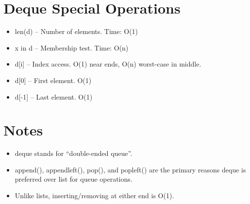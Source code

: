 \documentclass[11pt]{article}
\begin{document}
\section*{Deque Special Operations}

\begin{itemize}
\item len(d) -- Number of elements. Time: O(1)
\item x in d -- Membership test. Time: O(n)
\item d[i] -- Index access. O(1) near ends, O(n) worst-case in middle.
\item d[0] -- First element. O(1)
\item d[-1] -- Last element. O(1)
\end{itemize}

\section*{Notes}
\begin{itemize}
\item deque stands for ``double-ended queue''.
\item append(), appendleft(), pop(), and popleft() are the primary reasons deque is preferred over list for queue operations.
\item Unlike lists, inserting/removing at either end is O(1).
\end{itemize}
\end{document}

